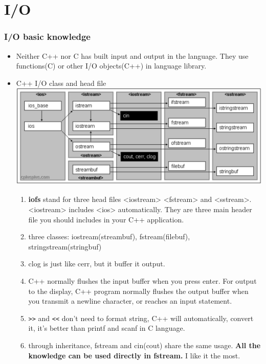 \documentclass[a4paper,12pt,twoside]{book}
\begin{document}
\section{I/O}
\subsubsection{I/O basic knowledge}
\begin{itemize}
\item Neither C++ nor C has built input and output in the language. They use functions(C) or other I/O objects(C++) in language library.
\item C++ I/O class and head file \\
\includegraphics[scale=0.45]{pics/io.png}
\begin{enumerate}


\item \textbf{iofs} stand for three head files <iostream> <fstream> and <sstream>. <iostream> includes <ios> automatically. They are three main header file you should includes in your C++ application.

\item three classes: iostream(streambuf), fstream(filebuf), stringstream(stringbuf)

\item clog is just like cerr, but it buffer it output.

\item C++ normally flushes the input buffer when you press enter. For output to the display, C++ program normally flushes the output buffer when you transmit a newline character, or reaches an input statement.

\item \verb=>>= and \verb=<<= don't need to format string,  C++ will automatically,  convert it, it's better than printf and scanf in C language.

\item through inheritance, fstream and cin(cout) share the same usage. \textbf{All the knowledge can be used directly in fstream.} I like it the most.

\end{enumerate}

\end{itemize}
\end{document}
